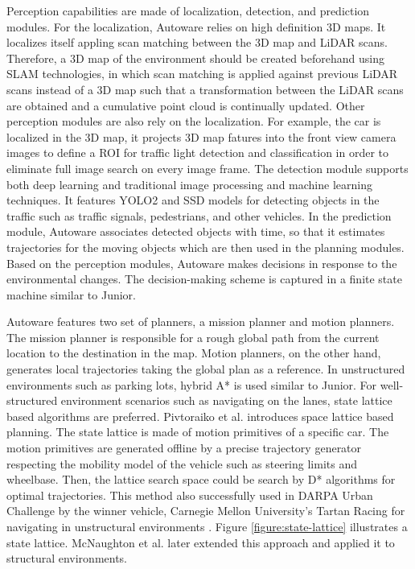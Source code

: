 Perception capabilities are made of localization, detection, and prediction
modules. For the localization, Autoware relies on high definition 3D maps. It
localizes itself appling scan matching between the 3D map and LiDAR scans.
Therefore, a 3D map of the environment should be created beforehand using SLAM
technologies, in which scan matching is applied against previous LiDAR scans
instead of a 3D map such that a transformation between the LiDAR scans are
obtained and a cumulative point cloud is continually updated. Other perception
modules are also rely on the localization. For example, the car is localized in
the 3D map, it projects 3D map fatures into the front view camera images to
define a ROI for traffic light detection and classification in order to
eliminate full image search on every image frame. The detection module supports
both deep learning and traditional image processing and machine learning
techniques. It features YOLO2 \cite{Redmon2016YOLO9000BF} and SSD
\cite{Liu2016SSDSS} models for detecting objects in the traffic such as traffic
signals, pedestrians, and other vehicles. In the prediction module, Autoware
associates detected objects with time, so that it estimates trajectories for
the moving objects which are then used in the planning modules. Based on the
perception modules, Autoware makes decisions in response to the environmental
changes. The decision-making scheme is captured in a finite state machine
similar to Junior.

Autoware features two set of planners, a mission planner and motion planners.
The mission planner is responsible for a rough global path from the current
location to the destination in the map. Motion planners, on the other hand,
generates local trajectories taking the global plan as a reference. In
unstructured environments such as parking lots, hybrid A* is used similar to
Junior. For well-structured environment scenarios such as navigating on the
lanes, state lattice based algorithms are preferred. Pivtoraiko et al.
\cite{Pivtoraiko2009DifferentiallyCM} introduces space lattice based planning.
The state lattice is made of motion primitives of a specific car. The motion
primitives are generated offline by a precise trajectory generator respecting
the mobility model of the vehicle such as steering limits and wheelbase. Then,
the lattice search space could be search by D* algorithms for optimal
trajectories. This method also successfully used in DARPA Urban Challenge by
the winner vehicle, Carnegie Mellon University's Tartan Racing for navigating
in unstructural environments \cite{Urmson2007TartanRA}. Figure
\ref{figure:state-lattice} illustrates a state lattice. McNaughton et al.
\cite{McNaughton2011MotionPF} later extended this approach and applied it to
structural environments.


